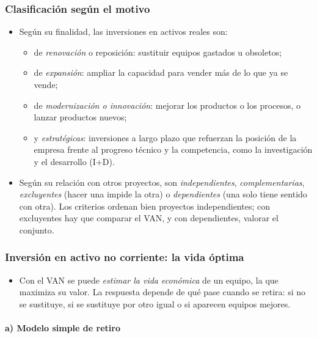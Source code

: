 \documentclass[11pt]{article}
\begin{document}
\subsubsection{Clasificación según el motivo}\label{sec:clasificacion}

\begin{itemize}
\item Según su finalidad, las inversiones en activos reales son:
  \begin{itemize}
  \item de \emph{renovación} o reposición: sustituir equipos gastados u obsoletos;
  \item de \emph{expansión}: ampliar la capacidad para vender más de lo que ya se vende;
  \item de \emph{modernización o innovación}: mejorar los productos o los procesos, o lanzar productos nuevos;
  \item y \emph{estratégicas}: inversiones a largo plazo que refuerzan la posición de la empresa frente al progreso técnico y la competencia, como la investigación y el desarrollo (I+D).
  \end{itemize}
\item Según su relación con otros proyectos, son \emph{independientes}, \emph{complementarias}, \emph{excluyentes} (hacer una impide la otra) o \emph{dependientes} (una solo tiene sentido con otra). Los criterios ordenan bien proyectos independientes; con excluyentes hay que comparar el VAN, y con dependientes, valorar el conjunto\nocite{SuarezSuarez2014Decisiones}.
\end{itemize}

\subsubsection{Inversión en activo no corriente: la vida óptima}\label{sec:no-corriente}

\begin{itemize}
\item Con el VAN se puede \emph{estimar la vida económica} de un equipo, la que maximiza su valor. La respuesta depende de qué pase cuando se retira: si no se sustituye, si se sustituye por otro igual o si aparecen equipos mejores\nocite{SuarezSuarez2014Decisiones}.
\end{itemize}

\paragraph{a) Modelo simple de retiro}
\end{document}
